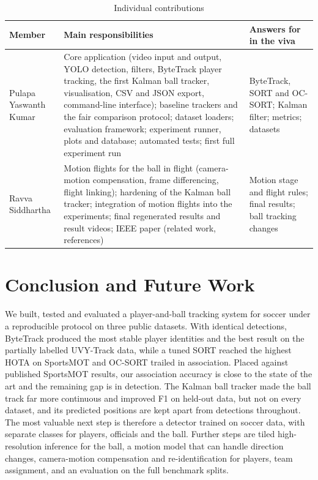 \documentclass[11pt,a4paper]{article}
\begin{document}
\begin{table}[!t]
\caption{Individual contributions}
\label{tab:contrib}
\centering
\footnotesize
\begin{tabular}{@{}p{3.4cm}p{9.2cm}p{3.6cm}@{}}
\toprule
Member & Main responsibilities & Answers for in the viva \\
\midrule
Pulapa Yaswanth Kumar & Core application (video input and output, YOLO detection, filters, ByteTrack player tracking, the first Kalman ball tracker, visualisation, CSV and JSON export, command-line interface); baseline trackers and the fair comparison protocol; dataset loaders; evaluation framework; experiment runner, plots and database; automated tests; first full experiment run & ByteTrack, SORT and OC-SORT; Kalman filter; metrics; datasets \\
Ravva Siddhartha & Motion flights for the ball in flight (camera-motion compensation, frame differencing, flight linking); hardening of the Kalman ball tracker; integration of motion flights into the experiments; final regenerated results and result videos; IEEE paper (related work, references) & Motion stage and flight rules; final results; ball tracking changes \\
\bottomrule
\end{tabular}
\end{table}

\section{Conclusion and Future Work}
We built, tested and evaluated a player-and-ball tracking system for soccer
under a reproducible protocol on three public datasets. With identical
detections, ByteTrack produced the most stable player identities and the best
result on the partially labelled UVY-Track data, while a tuned SORT reached the
highest HOTA on SportsMOT and OC-SORT trailed in association. Placed against
published SportsMOT results, our association accuracy is close to the state of
the art and the remaining gap is in detection. The Kalman ball tracker made the
ball track far more continuous and improved F1 on held-out data, but not on
every dataset, and its predicted positions are kept apart from detections
throughout. The most valuable next step is therefore a detector trained on
soccer data, with separate classes for players, officials and the ball.
Further steps are tiled high-resolution inference for the ball, a motion model
that can handle direction changes, camera-motion compensation and
re-identification for players, team assignment, and an evaluation on the full
benchmark splits.
\end{document}
